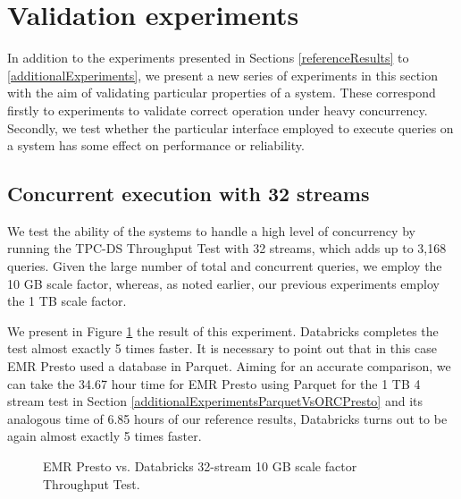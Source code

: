 \section{Validation experiments}\label{validationExperiments}

In addition to the experiments presented in Sections \ref{referenceResults} to \ref{additionalExperiments}, we present a new series of experiments in this section with the aim of validating particular properties of a system. These correspond firstly to experiments to validate correct operation under heavy concurrency. Secondly, we test whether the particular interface employed to execute queries on a system has some effect on performance or reliability.

\subsection{Concurrent execution with 32 streams}\label{concurrent32streams}

We test the ability of the systems to handle a high level of concurrency by running the TPC-DS Throughput Test with 32 streams, which adds up to 3,168 queries. Given the large number of total and concurrent queries, we employ the 10 GB scale factor, whereas, as noted earlier, our previous experiments employ the 1 TB scale factor.

We present in Figure \ref{fig:validationExperimentsStreams32TputTest} the result of this experiment. Databricks completes the test almost exactly 5 times faster. It is necessary to point out that in this case EMR Presto used a database in Parquet. Aiming for an accurate comparison, we can take the 34.67 hour time for EMR Presto using Parquet for the 1 TB 4 stream test in Section \ref{additionalExperimentsParquetVsORCPresto} and its analogous time of 6.85 hours of our reference results, Databricks turns out to be again almost exactly 5 times faster.

\begin{figure}
   \begin{center}
   \end{center}
   \caption{EMR Presto vs. Databricks 32-stream 10 GB scale factor Throughput Test.}
   \label{fig:validationExperimentsStreams32TputTest}
\end{figure}

